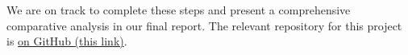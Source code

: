 \documentclass[11pt]{article}
\begin{document}
We are on track to complete these steps and present a comprehensive comparative analysis in our final report.
The relevant repository for this project is \href{https://github.com/DruhanShah/indic-morpho-semantic-circuits}{on GitHub (this link)}.



\end{document}
